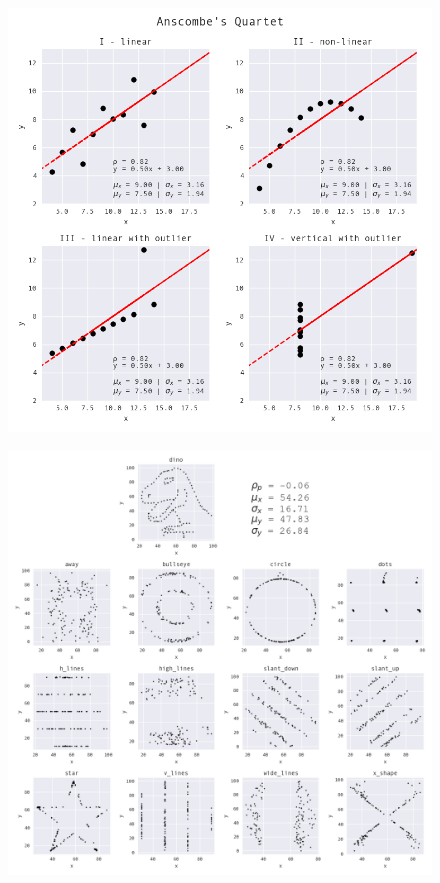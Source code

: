 \documentclass[10pt]{beamer}
\begin{document}
\begin{frame}
  \begin{figure}
    \includegraphics[height=.95\textheight]{fig/note01/anscombes-quartet.png}
  \end{figure}
\end{frame}

\begin{frame}
  \begin{figure}
    \includegraphics[height=.95\textheight]{fig/note01/datasaurus-dozen.png}
  \end{figure}
\end{frame}
\end{document}
